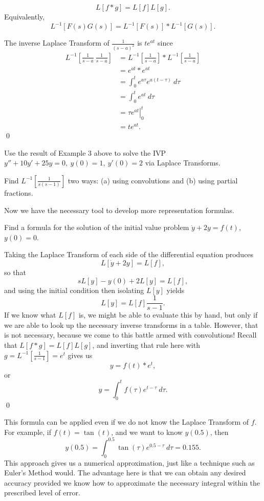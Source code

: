 {{{\begin{center}
{\begin{minipage}{4.5in}
\[ L[f*g] = L[f]L[g].\]
Equivalently,
\[ L^{-1}[F(s)G(s)] = L^{-1}[F(s)] * L^{-1}[G(s)]. \]
\end{minipage}
}
\end{center}


\example The inverse Laplace Transform of $\frac{1}{(s-a)^2}$ is $te^{at}$ since
\begin{align*}
L^{-1} \left[ \frac{1}{s-a} \ \frac{1}{s-a} \right] & = L^{-1} \left[ \frac{1}{s-a}\right] * L^{-1} \left[ \frac{1}{s-a} \right] \\
& = e^{at} * e^{at} \\
& = \int_0^t e^{a\tau} e^{a(t-\tau)} \ d\tau \\
& = \int_0^t e^{at} \ d\tau \\
& = \left. \tau e^{at} \right|_0^t \\
& = te^{at}.
\end{align*}
\qed

\begin{exe}
Use the result of Example 3 above to solve the IVP $y''+10y'+25y=0, \ y(0)=1, \ y'(0)=2$ via Laplace Transforms.
\end{exe}

\begin{exe} 
Find $L^{-1} \left[ \frac{1}{s(s-1)} \right]$ two ways: (a) using convolutions and (b) using partial fractions.
\end{exe}





Now we have the necessary tool to develop more representation formulas.  

\example Find a formula for the solution of the initial value problem $\dot{y}+2y=f(t)$,  $y(0)=0$.  

Taking the Laplace Transform of each side of the differential equation produces
\[ L[\dot{y}+2y] = L[f],\]
so that
\[ s L[y]-y(0)+2L[y]=L[f],\]
and using the initial condition then isolating $L[y]$ yields
\[ L[y] = L[f]\frac{1}{s-1}.\]
If we know what $L[f]$ is, we might be able to evaluate this by hand, but only if we are able to look up the necessary inverse transforms in a table.  However, that is not necessary, because we come to this battle armed with convolutions!  Recall that $L[f*g]=L[f]L[g]$, and inverting that rule here with $g=L^{-1} \left[ \frac{1}{s-1} \right] = e^t$ gives us
\[ y = f(t) *e^t,\]
or
\[ y = \int_0^t f(\tau) e^{t-\tau} \ d\tau.\]
\qed

This formula can be applied even if we do not know the Laplace Transform of $f$.  For example, if $f(t)=\tan(t)$, and we want to know $y(0.5)$, then
\[ y(0.5) = \int_0^{0.5} \tan(\tau) e^{0.5 - \tau} \ d\tau = 0.155.\]
This approach gives us a numerical approximation, just like a technique such as Euler's Method would.  The advantage here is that we can obtain any desired accuracy provided we know how to approximate the necessary integral within the prescribed level of error.

}}}
